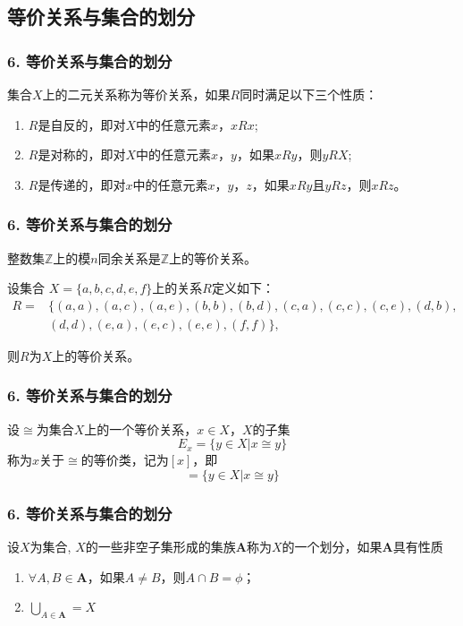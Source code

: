 \documentclass{beamer}
\begin{document}
\begin{CJK*}{UTF8}{gbsn}
\section{等价关系与集合的划分}
\begin{frame}
  \frametitle{6. 等价关系与集合的划分}
  \begin{Def}
    集合$X$上的二元关系称为\alert{等价关系}，如果$R$同时满足以下三个性质：
    \begin{enumerate}[(1)]
    \item $R$是自反的，即对$X$中的任意元素$x$，$xRx$;
    \item $R$是对称的，即对$X$中的任意元素$x$，$y$，如果$xRy$，则$yRX$;
    \item $R$是传递的，即对$x$中的任意元素$x$，$y$，$z$，如果$xRy$且$yRz$，则$xRz$。
    \end{enumerate}
  \end{Def}
\end{frame}
\begin{frame}
  \frametitle{6. 等价关系与集合的划分}
  \begin{Ex}
    整数集$\mathbb{Z}$上的模$n$同余关系是$\mathbb{Z}$上的等价关系。
  \end{Ex}\pause
  \begin{Ex}
    设集合
    $X=\{a,b,c,d,e,f \}$上的关系$R$定义如下：
    \begin{align*}
      R=&\{(a,a),(a,c),(a,e),(b,b),(b,d),(c,a),(c,c),(c,e),(d,b),\\
      &(d,d),(e,a),(e,c),(e,e),(f,f)\},
    \end{align*}
  \end{Ex}
  则$R$为$X$上的等价关系。
\end{frame}
\begin{frame}
  \frametitle{6. 等价关系与集合的划分}
  \begin{Def}
    设$\cong$为集合$X$上的一个等价关系，$x\in X$，$X$的子集
    \[E_x=\{y\in X | x \cong y\}\]称为$x$关于$\cong$的\alert{等价类}，记为$[x]$，即
    \begin{equation*}
      [x] = \{y \in X | x \cong y\}
    \end{equation*}
  \end{Def}
\end{frame}
\begin{frame}
  \frametitle{6. 等价关系与集合的划分}
  \begin{Def}
    设$X$为集合, $X$的一些非空子集形成的集族$\mathbf{A}$称为$X$的一个划分，如果$\mathbf{A}$具有性质
    \begin{enumerate}
    \item $\forall A, B \in \mathbf{A}$，如果$A \neq B$，则$A \cap B = \phi$；
      \item $\bigcup_{A \in \mathbf{A}} = X$
    \end{enumerate}
  \end{Def}
\end{frame}


\end{CJK*}
\end{document}
